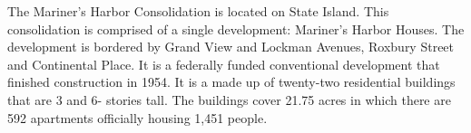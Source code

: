 The Mariner's Harbor Consolidation is located on State Island. This consolidation is comprised of a single development: Mariner's Harbor Houses. The development is bordered by Grand View and Lockman Avenues, Roxbury Street and Continental Place. It is a federally funded conventional development that finished construction in 1954. It is a made up of twenty-two residential buildings that are 3 and 6- stories tall. The buildings cover 21.75 acres in which there are 592 apartments officially housing 1,451 people.